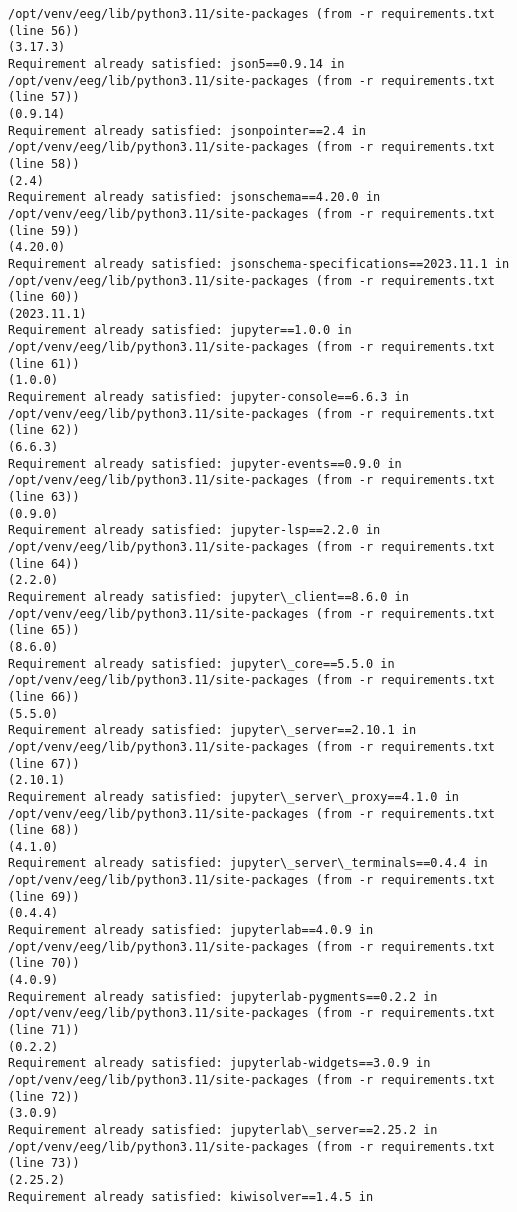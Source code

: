 \documentclass[11pt]{article}
\begin{document}
\begin{Verbatim}[commandchars=\\\{\}]
/opt/venv/eeg/lib/python3.11/site-packages (from -r requirements.txt (line 56))
(3.17.3)
Requirement already satisfied: json5==0.9.14 in
/opt/venv/eeg/lib/python3.11/site-packages (from -r requirements.txt (line 57))
(0.9.14)
Requirement already satisfied: jsonpointer==2.4 in
/opt/venv/eeg/lib/python3.11/site-packages (from -r requirements.txt (line 58))
(2.4)
Requirement already satisfied: jsonschema==4.20.0 in
/opt/venv/eeg/lib/python3.11/site-packages (from -r requirements.txt (line 59))
(4.20.0)
Requirement already satisfied: jsonschema-specifications==2023.11.1 in
/opt/venv/eeg/lib/python3.11/site-packages (from -r requirements.txt (line 60))
(2023.11.1)
Requirement already satisfied: jupyter==1.0.0 in
/opt/venv/eeg/lib/python3.11/site-packages (from -r requirements.txt (line 61))
(1.0.0)
Requirement already satisfied: jupyter-console==6.6.3 in
/opt/venv/eeg/lib/python3.11/site-packages (from -r requirements.txt (line 62))
(6.6.3)
Requirement already satisfied: jupyter-events==0.9.0 in
/opt/venv/eeg/lib/python3.11/site-packages (from -r requirements.txt (line 63))
(0.9.0)
Requirement already satisfied: jupyter-lsp==2.2.0 in
/opt/venv/eeg/lib/python3.11/site-packages (from -r requirements.txt (line 64))
(2.2.0)
Requirement already satisfied: jupyter\_client==8.6.0 in
/opt/venv/eeg/lib/python3.11/site-packages (from -r requirements.txt (line 65))
(8.6.0)
Requirement already satisfied: jupyter\_core==5.5.0 in
/opt/venv/eeg/lib/python3.11/site-packages (from -r requirements.txt (line 66))
(5.5.0)
Requirement already satisfied: jupyter\_server==2.10.1 in
/opt/venv/eeg/lib/python3.11/site-packages (from -r requirements.txt (line 67))
(2.10.1)
Requirement already satisfied: jupyter\_server\_proxy==4.1.0 in
/opt/venv/eeg/lib/python3.11/site-packages (from -r requirements.txt (line 68))
(4.1.0)
Requirement already satisfied: jupyter\_server\_terminals==0.4.4 in
/opt/venv/eeg/lib/python3.11/site-packages (from -r requirements.txt (line 69))
(0.4.4)
Requirement already satisfied: jupyterlab==4.0.9 in
/opt/venv/eeg/lib/python3.11/site-packages (from -r requirements.txt (line 70))
(4.0.9)
Requirement already satisfied: jupyterlab-pygments==0.2.2 in
/opt/venv/eeg/lib/python3.11/site-packages (from -r requirements.txt (line 71))
(0.2.2)
Requirement already satisfied: jupyterlab-widgets==3.0.9 in
/opt/venv/eeg/lib/python3.11/site-packages (from -r requirements.txt (line 72))
(3.0.9)
Requirement already satisfied: jupyterlab\_server==2.25.2 in
/opt/venv/eeg/lib/python3.11/site-packages (from -r requirements.txt (line 73))
(2.25.2)
Requirement already satisfied: kiwisolver==1.4.5 in

\end{Verbatim}
\end{document}
